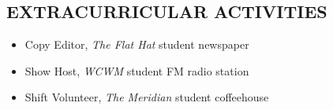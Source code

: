 \documentclass{res}
\begin{document}
\begin{resume}
\section{EXTRACURRICULAR ACTIVITIES}          
\vspace{5mm}
\begin{itemize}[leftmargin=5mm]
    \item Copy Editor, \emph{The Flat Hat} student newspaper
    \item Show Host, \emph{WCWM} student FM radio station
    \item Shift Volunteer, \emph{The Meridian} student coffeehouse
\end{itemize}
 
\end{resume}
\end{document}
